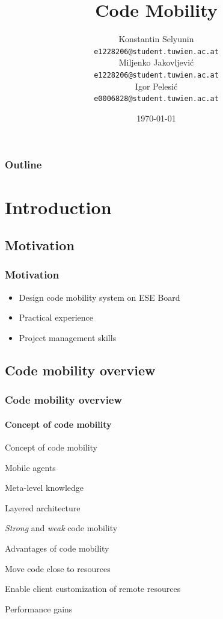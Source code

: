 \documentclass{beamer}
\title[Code Mobility]{Code Mobility}
\date{\today}
\author[Jakovljevi\'c,Selyunin,Pelesi\'c]{
 \Large{Konstantin Selyunin}\\
  \small{\texttt{e1228206@student.tuwien.ac.at}}\\
 \Large{Miljenko Jakovljevi\'c}\\
  \small{\texttt{e1228206@student.tuwien.ac.at}}\\
  \Large{Igor Pelesi\'c}\\
  \small{\texttt{e0006828@student.tuwien.ac.at}}\\
}
\theoremstyle{definition} \newtheorem{mdefinition}{Definition}
\theoremstyle{plain} \newtheorem{mtheorem}{Theorem}
\theoremstyle{plain} \newtheorem{mcorollary}{Corollary}
\theoremstyle{plain} \newtheorem{mfact}{Fact}
\begin{document}
\begin{frame}
	\titlepage
\end{frame}

\begin{frame}
	\frametitle{Outline}
	\tableofcontents
\end{frame}

\section{Introduction}
\subsection{Motivation}
\begin{frame}[fragile]
	\frametitle{Motivation}
	\begin{itemize}
		\item Design code mobility system on ESE Board
		\item Practical experience
		\item Project management skills
	\end{itemize}
\end{frame}

\subsection{Code mobility overview}
\begin{frame}
	\frametitle{Code mobility overview}
 		\framesubtitle{Concept of code mobility}
	\begin{block}{Concept of code mobility}
		\begin{description}
			\item	Mobile agents
			\item	Meta-level knowledge
			\item   Layered architecture
			\item	{\it Strong} and {\it weak} code mobility
		\end{description}
	\end{block}

	\begin{block}{Advantages of code mobility}
		\begin{description}
			\item	Move code close to resources 
			\item	Enable client customization of remote resources
			\item	Performance gains
		\end{description}
	\end{block}	

\end{frame}
\end{document}

